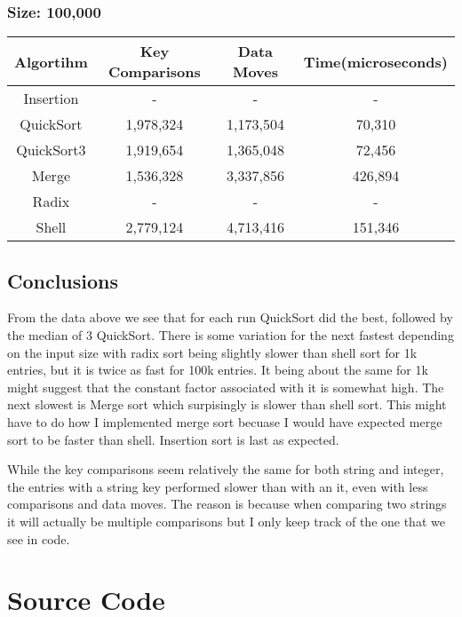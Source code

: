 \documentclass[titlepage]{article}
\begin{document}
\subsubsection{Size: 100,000}
\begin{tabular}{|*{4}{c|}}
    \hline
    Algortihm  & Key Comparisons & Data Moves & Time(microseconds) \\
    \hline
    Insertion  & -               & -          & -                  \\
    \hline
    QuickSort  & 1,978,324       & 1,173,504  & 70,310             \\
    \hline
    QuickSort3 & 1,919,654       & 1,365,048  & 72,456             \\
    \hline
    Merge      & 1,536,328       & 3,337,856  & 426,894            \\
    \hline
    Radix      & -               & -          & -                  \\
    \hline
    Shell      & 2,779,124       & 4,713,416  & 151,346            \\
    \hline
\end{tabular}
\subsection{Conclusions}
From the data above we see that for each run QuickSort did the best, followed
by the median of 3 QuickSort. There is some variation for the next fastest depending on the
input size with radix sort being slightly slower than shell sort for 1k entries, but it is
twice as fast for 100k entries. It being about the same for 1k might suggest that the constant
factor associated with it is somewhat high. The next slowest is Merge sort which surpisingly is
slower than shell sort. This might have to do how I implemented merge sort becuase I would have expected
merge sort to be faster than shell. Insertion sort is last as expected.

While the key comparisons seem relatively the same for both string and integer, the entries with
a string key performed slower than with an it, even with less comparisons and data moves. The reason is
because when comparing two strings it will actually be multiple comparisons but I only keep track of the one
that we see in code.

\newpage

\section{Source Code}
\end{document}
